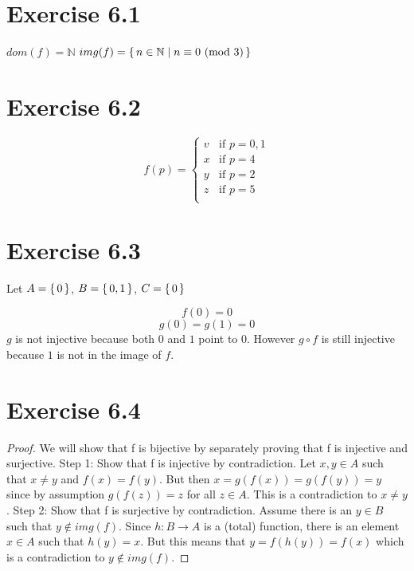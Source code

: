 \documentclass{article} %
\newcommand{\homeworkNumber}{6}
\begin{document}
\section*{Exercise \homeworkNumber.1}

$dom(f) = \mathbb{N}$\newline
$img(f) = \set{n \in \mathbb{N} \mid n \equiv 0 \text{ (mod 3)}}$


\section*{Exercise \homeworkNumber.2}

\begin{equation}
f(p) = \begin{cases}
		v & \text{if } p = 0,1\\
		x & \text{if } p = 4\\
		y & \text{if } p = 2\\
		z & \text{if } p = 5\\
	\end{cases}
\end{equation}

\section*{Exercise \homeworkNumber.3}

Let $A = \set{0}$, $B = \set{0, 1}$, $C = \set{0}$

\begin{equation}
f(0) = 0
\end{equation}
\begin{equation}
g(0) = g(1) = 0
\end{equation}
\noindent
$g$ is not injective because both $0$ and $1$ point to $0$. However $g \circ f$ is still injective because $1$ is not in the image of $f$.



\section*{Exercise \homeworkNumber.4}

\begin{proof}
We will show that f is bijective by separately proving that f is injective and surjective. \newline 
Step 1: Show that f is injective by contradiction. \newline
Let $x,y \in A$ such that $x \neq y$ and $f(x) = f(y)$. But then $x = g(f(x)) = g(f(y)) = y$ since by assumption $g(f(z)) = z$ for all $z \in A$. This is a contradiction to $x \neq y$. \newline
Step 2: Show that f is surjective by contradiction. \newline
Assume there is an $y \in B$ such that $y \notin img(f)$. Since $h: B \rightarrow A$ is a (total) function, there is an element $x \in A$ such that $h(y) = x$. But this means that $y = f(h(y)) = f(x)$ which is a contradiction to $y \notin img(f)$.

\end{proof}
\end{document}
